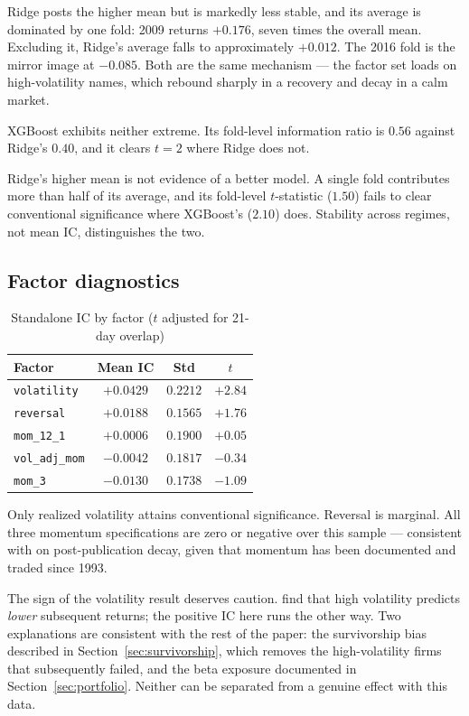 \documentclass[11pt]{article}
\begin{document}
Ridge posts the higher mean but is markedly less stable, and its average is
dominated by one fold: 2009 returns $+0.176$, seven times the overall mean.
Excluding it, Ridge's average falls to approximately $+0.012$. The 2016 fold is
the mirror image at $-0.085$. Both are the same mechanism --- the factor set
loads on high-volatility names, which rebound sharply in a recovery and decay in
a calm market.

XGBoost exhibits neither extreme. Its fold-level information ratio is $0.56$
against Ridge's $0.40$, and it clears $t=2$ where Ridge does not.

Ridge's higher mean is not evidence of a better model. A single fold contributes
more than half of its average, and its fold-level $t$-statistic ($1.50$) fails
to clear conventional significance where XGBoost's ($2.10$) does. Stability
across regimes, not mean IC, distinguishes the two.

\subsection{Factor diagnostics}

\begin{table}[H]
\centering
\caption{Standalone IC by factor ($t$ adjusted for 21-day overlap)}
\begin{tabular}{lccc}
\toprule
\textbf{Factor} & \textbf{Mean IC} & \textbf{Std} & \textbf{$t$} \\
\midrule
\texttt{volatility}    & $+0.0429$ & $0.2212$ & $\mathbf{+2.84}$ \\
\texttt{reversal}      & $+0.0188$ & $0.1565$ & $+1.76$ \\
\texttt{mom\_12\_1}    & $+0.0006$ & $0.1900$ & $+0.05$ \\
\texttt{vol\_adj\_mom} & $-0.0042$ & $0.1817$ & $-0.34$ \\
\texttt{mom\_3}        & $-0.0130$ & $0.1738$ & $-1.09$ \\
\bottomrule
\end{tabular}
\end{table}

Only realized volatility attains conventional significance. Reversal is
marginal. All three momentum specifications are zero or negative over this
sample --- consistent with \citet{mclean2016} on post-publication decay, given
that momentum has been documented and traded since 1993.

The sign of the volatility result deserves caution. \citet{ang2006} find that
high volatility predicts \emph{lower} subsequent returns; the positive IC here
runs the other way. Two explanations are consistent with the rest of the paper:
the survivorship bias described in Section~\ref{sec:survivorship}, which
removes the high-volatility firms that subsequently failed, and the beta
exposure documented in Section~\ref{sec:portfolio}. Neither can be separated
from a genuine effect with this data.
\end{document}
